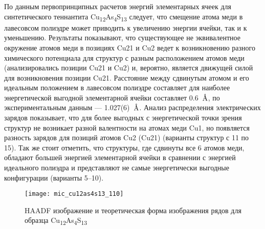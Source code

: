 По данным первопринципных расчетов энергий элементарных ячеек для синтетического теннантита Cu\textsubscript{12}As\textsubscript{4}S\textsubscript{13} следует,  что смещение атома меди в лавесовсом полиэдре может приводить к увеличению энергии ячейки, так и к уменьшению.
Результаты показывают, что существующее не эквивалентное  окружение атомов меди в позициях Cu21 и Cu2 ведет к возникновению разного химического потенциала для структур с разным расположением атомов меди (анализировались позиции Cu21 и Cu2) и, вероятно, является движущей силой для возникновения позиции Cu21. Расстояние между сдвинутым атомом и его идеальным положением в лавесовсом полиэдре составляет для наиболее энергетической выгодной элементарной ячейки составляет 0.6~$\mbox{\normalfont\AA}$, по экспериментальным данным --- 1.027(6)~$\mbox{\normalfont\AA}$. 
Анализ распределения электрических зарядов показывает, что для более выгодных с энергетической точки зрения структур не возникает разной валентности на атомах меди Cu1, 
но появляется разность зарядов для позиций атомов Cu2 (Cu21) (варианты структур с 11 по 15). Так же стоит отметить, что структуры, где сдвинуты все 6 атомов меди, обладают большей энергией элементарной ячейки в сравнении с энергией идеального полиэдра и представляют не самые энергетически выгодные конфигурации  (варианты 5--10).







\begin{figure}[pt!]
\centering
  \begin{minipage}[ht]{0.7\linewidth}\centering
    \texttt{[image: mic\_cu12as4s13\_110]} \\
  \end{minipage}
 
  \caption[HAADF изображение и теоретическая форма изображения рядов для образца Cu\textsubscript{12}As\textsubscript{4}S\textsubscript{13}]{HAADF изображение и теоретическая форма изображения рядов для образца Cu\textsubscript{12}As\textsubscript{4}S\textsubscript{13}}
    \label{img:mic3}
\end{figure}

